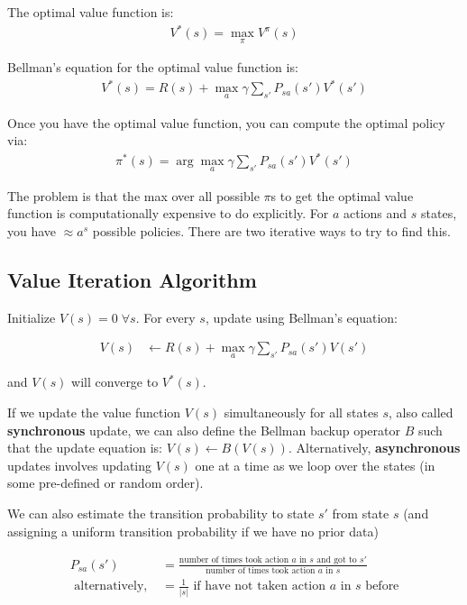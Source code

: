 \documentclass[letterpaper,10pt]{article}
\begin{document}
The optimal value function is:
\begin{align}
V^*(s) = \max_\pi V^\pi (s)
\end{align}

Bellman's equation for the optimal value function is:
\begin{align}
V^*(s) = R(s) + \max_a \gamma \sum_{s'} P_{s a} (s') V^* (s')
\end{align}

Once you have the optimal value function, you can compute the optimal policy via:
\begin{align}
\pi^* (s) = \arg \max_a \gamma  \sum_{s'} P_{s a} (s') V^* (s') \label{OptimalPolicy}
\end{align}

The problem is that the max over all possible $\pi$s to get the optimal value function is computationally expensive to do explicitly. For $a$ actions and $s$ states, you have $\approx a^s$ possible policies. There are two iterative ways to try to find this.

\subsection{Value Iteration Algorithm}

Initialize $V(s) = 0 \; \forall s$. For every $s$, update using Bellman's equation:

\begin{align}
V(s) &\leftarrow R(s) + \max_a \gamma \sum_{s'} P_{s a} (s') V (s')
\end{align}

and $V(s)$ will converge to $V^*(s)$. 

If we update the value function $V(s)$ simultaneously for all states $s$, also called \textbf{synchronous} update, we can also define the Bellman backup operator $B$ such that the update equation is: $V(s) \leftarrow B(V(s))$. Alternatively, \textbf{asynchronous} updates involves updating $V(s)$ one at a time as we loop over the states (in some pre-defined or random order). 

We can also estimate the transition probability to state $s'$ from state $s$ (and assigning a uniform transition probability if we have no prior data)

\begin{align}
P_{s a} (s') &= \frac{\text{number of times took action }a\text{ in }s\text{ and got to } s'}{\text{number of times took action }a\text{ in }s} \\
\text{ alternatively, } &= \frac{1}{|s|} \text{ if have not taken action }a\text{ in } s \text{ before}
\end{align}
\end{document}
